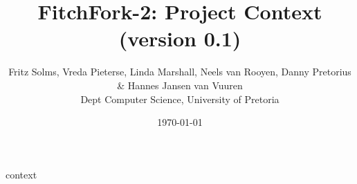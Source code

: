 \documentclass[titlepage]{article}
\title{FitchFork-2: Project Context \\
          (version 0.1)}
\author{Fritz Solms, Vreda Pieterse, Linda Marshall, Neels van Rooyen, Danny Pretorius \& Hannes Jansen van Vuuren \\ Dept Computer Science, University of Pretoria}
\date{\today}
\begin{document}
\maketitle

\tableofcontents

\newpage

{context}
\end{document}
